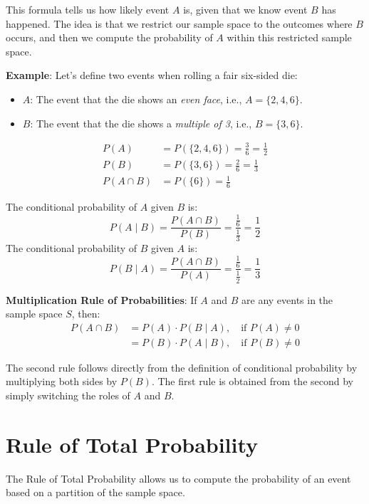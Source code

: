 \documentclass[twoside]{book}
\begin{document}
This formula tells us how likely event \( A \) is, given that we know event \( B \) has happened. The idea is that we restrict our sample space to the outcomes where \( B \) occurs, and then we compute the probability of \( A \) within this restricted sample space.

\textbf{Example}: Let's define two events when rolling a fair six-sided die:

\begin{itemize}
    \item \( A \): The event that the die shows an \textit{even face}, i.e., \( A = \{2, 4, 6\} \).
    \item \( B \): The event that the die shows a \textit{multiple of 3}, i.e., \( B = \{3, 6\} \).
\end{itemize}
\begin{align*}
    P(A) &= P(\{2, 4, 6\})= \frac{3}{6} = \frac{1}{2} \\
    P(B) &= P(\{3, 6\})=  \frac{2}{6} = \frac{1}{3} \\
    P(A \cap B) &= P(\{6\}) = \frac{1}{6}
\end{align*}

The conditional probability of \( A \) given \( B \) is:
\[
P(A \mid B) = \frac{P(A \cap B)}{P(B)} = \dfrac{\frac{1}{6}}{\frac{1}{3}}  = \frac{1}{2}
\]
The conditional probability of \( B \) given \( A \) is:
\[
P(B \mid A) = \frac{P(A \cap B)}{P(A)} =\frac{\frac{1}{6}}{\frac{1}{2}} = \frac{1}{3}
\]
\begin{textbox}
\textbf{Multiplication Rule of Probabilities}: If \( A \) and \( B \) are any events in the sample space \( S \), then:
\begin{align*}
    P(A \cap B) &= P(A) \cdot P(B \mid A), \quad \text{if } P(A) \neq 0 \\
 &= P(B) \cdot P(A \mid B), \quad \text{if } P(B) \neq 0
\end{align*}
\end{textbox}
The second rule follows directly from the definition of conditional probability by multiplying both sides by \( P(B) \).
The first rule is obtained from the second by simply switching the roles of \( A \) and \( B \).

\section{Rule of Total Probability}

The Rule of Total Probability allows us to compute the probability of an event based on a partition of the sample space.
\end{document}
